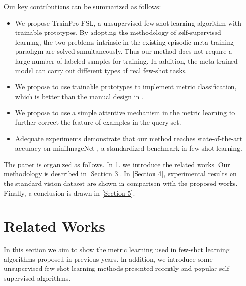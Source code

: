 \documentclass[conference]{IEEEtran}
\begin{document}
Our key contributions can be summarized as follows:
\begin{itemize}
\item We propose TrainPro-FSL, a  unsupervised few-shot learning algorithm with trainable prototypes. By adopting the methodology of self-supervised learning, the two problems intrinsic in the existing episodic meta-training paradigm are solved simultaneously. Thus our method does not require a large number of labeled samples for training. In addition, the meta-trained model can carry out different types of real few-shot tasks.
\item We propose to use trainable prototypes to implement metric classification, which is better than the manual design in \cite{wu2019simplifying}.
\item We propose to use a simple attentive mechanism in the metric learning to further correct the feature of examples in the query set.
\item Adequate experiments demonstrate that our method reaches state-of-the-art accuracy on miniImageNet , a standardized benchmark in few-shot learning.
\end{itemize}


The paper is organized as follows. In \ref{Section 2}, we introduce the related works. Our methodology is described in \ref{Section 3}. In \ref{Section 4}, experimental results on the standard vision dataset are shown in comparison with the proposed works. Finally, a conclusion is drawn in \ref{Section 5}.


\section{Related Works}\label{Section 2}
In this section we aim to show the metric learning used in few-shot learning algorithms proposed in previous years. In addition, we introduce some unsupervised few-shot learning methods presented recently and popular self-supervised algorithms.
\end{document}
